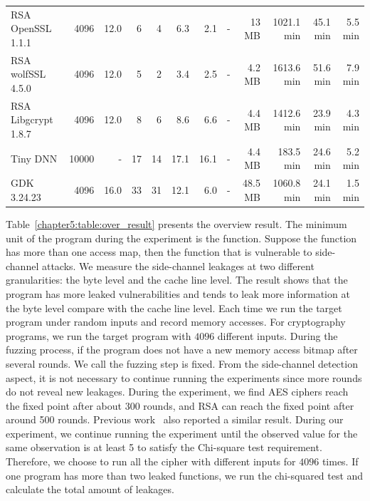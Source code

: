 \begin{table}
{\begin{tabular}{lrrrrrrrrrrr}
RSA OpenSSL 1.1.1& 4096 & 12.0 &6&4&6.3& 2.1&-&13 MB & 1021.1 min & 45.1 min & 5.5 min\\
RSA wolfSSL 4.5.0& 4096 & 12.0 &5&2&3.4& 2.5&-&4.2 MB & 1613.6 min & 51.6 min & 7.9 min\\
RSA Libgcrypt 1.8.7& 4096 & 12.0 &8&6&8.6& 6.6&-&4.4 MB & 1412.6 min & 23.9 min & 4.3 min\\
Tiny DNN & 10000 & - & 17&14&17.1&16.1&-& 4.4 MB & 183.5 min & 24.6 min & 5.2 min\\
GDK 3.24.23 & 4096 & 16.0 & 33&31& 12.1& 6.0&-& 48.5 MB & 1060.8 min & 24.1 min & 1.5 min\\
\bottomrule
\end{tabular}
}

\end{table}

Table~\ref{chapter5:table:over_result} presents the overview result. The minimum unit of the program during the experiment is the function. Suppose the function has more than one access map, then the function that is vulnerable to side-channel attacks. We measure the side-channel leakages at two different granularities: the byte level and the cache line level. The result shows that the program has more leaked vulnerabilities and tends to leak more information at the byte level compare with the cache line level. Each time we run the target program under random inputs and record memory accesses. For cryptography programs, we run the target program with $4096$ different inputs. During the fuzzing process, if the program does not have a new memory access bitmap after several rounds. We call the fuzzing step is fixed. From the side-channel detection aspect, it is not necessary to continue running the experiments since more rounds do not reveal new leakages. During the experiment, we find AES ciphers reach the fixed point after about 300 rounds, and RSA can reach the fixed point after around 500 rounds. Previous work~\cite{217537} also reported a similar result. During our experiment, we continue running the experiment until the observed value for the same observation is at least 5 to satisfy the Chi-square test requirement. Therefore, we choose to run all the cipher with different inputs for $4096$ times.  If one program has more than two leaked functions, we run the chi-squared test and calculate the total amount of leakages.



